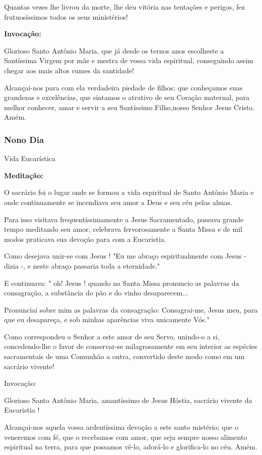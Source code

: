 \documentclass[a4paper,14pt]{extarticle} \usepackage[utf8]{inputenc}
\begin{document}
Quantas vezes lhe livrou da morte, lhe deu vitória nas tentações e perigos, fez frutuosíssimos todos os seus ministérios!

\textbf{Invocação:}

Glorioso Santo Antônio Maria, que já desde os ternos anos escolheste a Santíssima Virgem por mãe e mestra de vossa vida espiritual, conseguindo assim chegar aos mais altos cumes da santidade!

Alcançai-nos para com ela verdadeira piedade de filhos; que conheçamos suas grandezas e excelências, que sintamos o atrativo de seu Coração maternal, para melhor conhecer, amar e servir a seu Santíssimo Filho,nosso Senhor Jesus Cristo. Amém.

\subsubsection{Nono Dia}
Vida Eucarística

\textbf{Meditação:}

O sacrário foi o lugar onde se formou a vida espiritual de Santo Antônio Maria e onde continuamente se incendiava seu amor a Deus e seu céu pelas almas.

Para isso visitava frequentíssimamente a Jesus Sacramentado, passava grande tempo meditando seu amor, celebrava fervorosamente a Santa Missa e de mil modos praticava sua devoção para com a Eucaristia.

Como desejava unir-se com Jesus ! "Eu me abraço espiritualmente com Jesus -dizia -, e neste abraço passaria toda a eternidade."

E continuava: " oh! Jesus ! quando na Santa Missa pronuncio as palavras da consagração, a substãncia do pão e do vinho desaparecem...

Pronunciai sobre mim as palavras da consagração: Consagrai-me, Jesus meu, para que eu desapareça, e sob minhas aparências viva unicamente Vós."

Como correspondeu o Senhor a este amor de seu Servo, unindo-o a si, concedendo-lhe o favor de conservar-se milagrosamente em seu interior as espécies sacramentais de uma Comunhão a outra, convertido deste modo como em um sacrário vivente!

Invocação:

Glorioso Santo Antônio Maria, amantíssimo de Jesus Hóstia, sacrário vivente da Eucaristia !

Alcançai-nos aquela vossa ardentíssima devoção a este santo mistério; que o veneremos com fé, que o recebamos com amor, que seja sempre nosso alimento espiritual na terra, para que possamos vê-lo, adorá-lo e glorifica-lo no céu. Amém.
\end{document}
